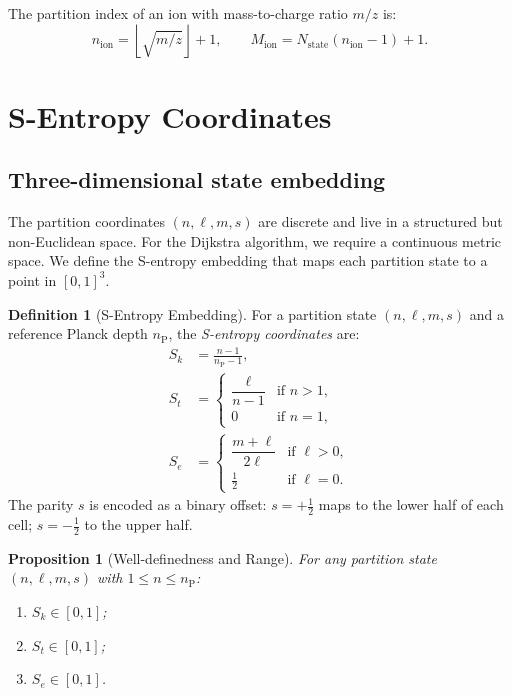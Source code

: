 \documentclass[twocolumn,10pt,a4paper]{article}
\theoremstyle{thmstyle}
\newtheorem{proposition}[theorem]{Proposition}
\theoremstyle{definition}
\newtheorem{definition}[theorem]{Definition}
\theoremstyle{remark}
\newcommand{\Sk}{S_{k}}
\newcommand{\St}{S_{t}}
\newcommand{\Se}{S_{e}}
\newcommand{\Mcyc}{M}
\newcommand{\nP}{n_{\mathrm{P}}}
\begin{document}
The partition index of an ion with mass-to-charge ratio $m/z$ is:
\begin{equation}
n_\text{ion} = \left\lfloor\sqrt{m/z}\right\rfloor + 1,
\qquad
\Mcyc_\text{ion} = N_\text{state}(n_\text{ion}-1) + 1.
\label{eq:mz_to_n}
\end{equation}

\section{S-Entropy Coordinates}
\label{sec:sentropy}

\subsection{Three-dimensional state embedding}

The partition coordinates $(n,\ell,m,s)$ are discrete and live in a
structured but non-Euclidean space. For the Dijkstra algorithm, we require
a continuous metric space. We define the S-entropy embedding that maps
each partition state to a point in $[0,1]^3$.

\begin{definition}[S-Entropy Embedding]
\label{def:sembedding}
For a partition state $(n,\ell,m,s)$ and a reference Planck depth $\nP$,
the \emph{S-entropy coordinates} are:
\begin{align}
\Sk &= \frac{n-1}{\nP - 1},
\label{eq:sk}\\
\St &= \begin{cases}
  \dfrac{\ell}{n-1} & \text{if } n > 1, \\
  0               & \text{if } n = 1,
\end{cases}
\label{eq:st}\\
\Se &= \begin{cases}
  \dfrac{m + \ell}{2\ell} & \text{if } \ell > 0, \\
  \tfrac{1}{2}            & \text{if } \ell = 0.
\end{cases}
\label{eq:se}
\end{align}
The parity $s$ is encoded as a binary offset: $s = +\tfrac{1}{2}$ maps
to the lower half of each cell; $s = -\tfrac{1}{2}$ to the upper half.
\end{definition}

\begin{proposition}[Well-definedness and Range]
\label{prop:range}
For any partition state $(n,\ell,m,s)$ with $1 \leq n \leq \nP$:
\begin{enumerate}[nosep,label=(\roman*)]
\item $\Sk \in [0,1]$;
\item $\St \in [0,1]$;
\item $\Se \in [0,1]$.
\end{enumerate}
\end{proposition}
\end{document}
